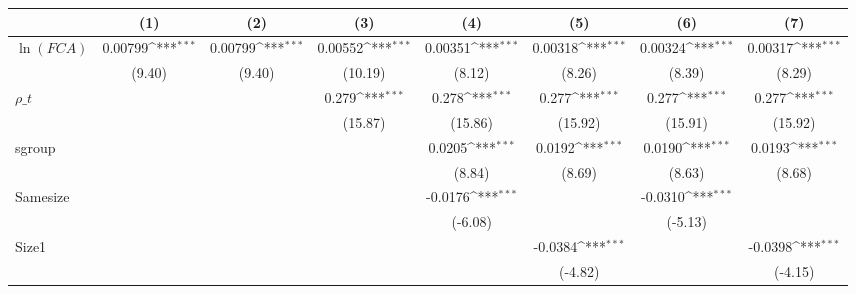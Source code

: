 {
\def\sym#1{\ifmmode^{#1}\else\(^{#1}\)\fi}
\begin{tabular}{l*{7}{c}}
\hline\hline
                    &\multicolumn{1}{c}{(1)}         &\multicolumn{1}{c}{(2)}         &\multicolumn{1}{c}{(3)}         &\multicolumn{1}{c}{(4)}         &\multicolumn{1}{c}{(5)}         &\multicolumn{1}{c}{(6)}         &\multicolumn{1}{c}{(7)}         \\
\hline
$\ln(FCA)$          &     0.00799\sym{***}&     0.00799\sym{***}&     0.00552\sym{***}&     0.00351\sym{***}&     0.00318\sym{***}&     0.00324\sym{***}&     0.00317\sym{***}\\
                    &      (9.40)         &      (9.40)         &     (10.19)         &      (8.12)         &      (8.26)         &      (8.39)         &      (8.29)         \\
[1em]
$ \rho\_t $          &                     &                     &       0.279\sym{***}&       0.278\sym{***}&       0.277\sym{***}&       0.277\sym{***}&       0.277\sym{***}\\
                    &                     &                     &     (15.87)         &     (15.86)         &     (15.92)         &     (15.91)         &     (15.92)         \\
[1em]
sgroup              &                     &                     &                     &      0.0205\sym{***}&      0.0192\sym{***}&      0.0190\sym{***}&      0.0193\sym{***}\\
                    &                     &                     &                     &      (8.84)         &      (8.69)         &      (8.63)         &      (8.68)         \\
[1em]
Samesize            &                     &                     &                     &     -0.0176\sym{***}&                     &     -0.0310\sym{***}&                     \\
                    &                     &                     &                     &     (-6.08)         &                     &     (-5.13)         &                     \\
[1em]
Size1               &                     &                     &                     &                     &     -0.0384\sym{***}&                     &     -0.0398\sym{***}\\
                    &                     &                     &                     &                     &     (-4.82)         &                     &     (-4.15)         \\

\end{tabular}}

